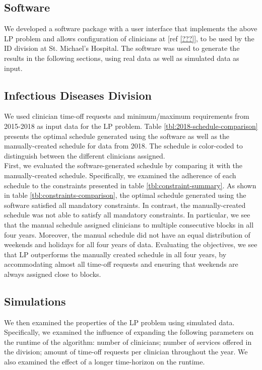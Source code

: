 \subsection{Software}
We developed a software package with a user interface that implements the above LP problem and allows configuration of clinicians at [ref \ref{???}], to be used by the ID division at St. Michael's Hospital. The software was used to generate the results in the following sections, using real data as well as simulated data as input.

\subsection{Infectious Diseases Division}  %
We used clinician time-off requests and minimum/maximum requirements from 2015-2018 as input data for the LP problem. Table \ref{tbl:2018-schedule-comparison} presents the optimal schedule generated using the software as well as the manually-created schedule for data from 2018. The schedule is color-coded to distinguish between the different clinicians assigned. \\



First, we evaluated the software-generated schedule by comparing it with the manually-created schedule. Specifically, we examined the adherence of each schedule to the constraints presented in table \ref{tbl:constraint-summary}. As shown in table \ref{tbl:constraints-comparison}, the optimal schedule generated using the software satisfied all mandatory constraints. In contrast, the manually-created schedule was not able to satisfy all mandatory constraints. In particular, we see that the manual schedule assigned clinicians to multiple consecutive blocks in all four years. Moreover, the manual schedule did not have an equal distribution of weekends and holidays for all four years of data. Evaluating the objectives, we see that LP outperforms the manually created schedule in all four years, by accommodating almost all time-off requests and ensuring that weekends are always assigned close to blocks. \\



\subsection{Simulations}
We then examined the properties of the LP problem using simulated data. Specifically, we examined the influence of expanding the following parameters on the runtime of the algorithm: number of clinicians; number of services offered in the division; amount of time-off requests per clinician throughout the year. We also examined the effect of a longer time-horizon on the runtime. \\

